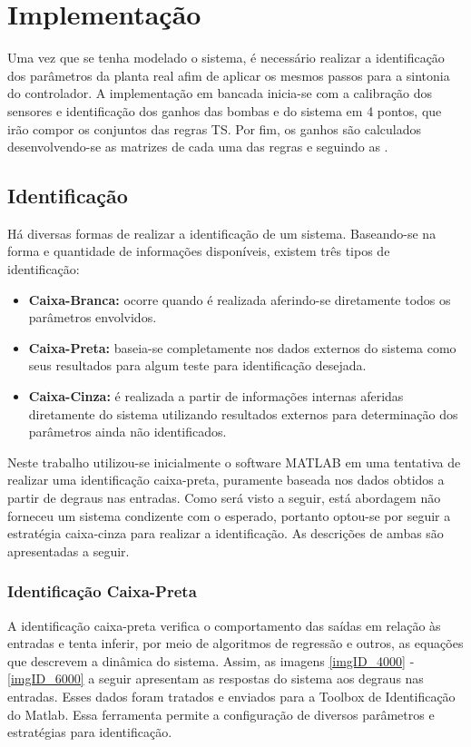 %

\chapter{Implementação} \label{capImp}
Uma vez que se tenha modelado o sistema, é necessário realizar a identificação dos parâmetros da planta real afim de aplicar os mesmos passos para a sintonia do controlador. A implementação em bancada inicia-se com a calibração dos sensores e identificação dos ganhos das bombas e do sistema em 4 pontos, que irão compor os conjuntos das regras TS. Por fim, os ganhos são calculados desenvolvendo-se as matrizes de cada uma das regras e seguindo as .

\section{Identificação}
Há diversas formas de realizar a identificação de um sistema. Baseando-se na forma e quantidade de informações disponíveis, existem três tipos de identificação:
\begin{itemize}
	\item \textbf{Caixa-Branca:} ocorre quando é realizada aferindo-se diretamente todos os parâmetros envolvidos.
	\item \textbf{Caixa-Preta:} baseia-se completamente nos dados externos do sistema como seus resultados para algum teste para identificação desejada.
	\item \textbf{Caixa-Cinza:} é realizada a partir de informações internas aferidas diretamente do sistema utilizando resultados externos para determinação dos parâmetros ainda não identificados.
\end{itemize}

Neste trabalho utilizou-se inicialmente o software MATLAB em uma tentativa de realizar uma identificação caixa-preta, puramente baseada nos dados obtidos a partir de degraus nas entradas. Como será visto a seguir, está abordagem não forneceu um sistema condizente com o esperado, portanto optou-se por seguir a estratégia caixa-cinza para realizar a identificação. As descrições de ambas são apresentadas a seguir.

\subsection{Identificação Caixa-Preta}
A identificação caixa-preta verifica o comportamento das saídas em relação às entradas e tenta inferir, por meio de algoritmos de regressão e outros, as equações que descrevem a dinâmica do sistema. Assim, as imagens \ref{imgID_4000} - \ref{imgID_6000} a seguir apresentam as respostas do sistema aos degraus nas entradas. Esses dados foram tratados e enviados para a Toolbox de Identificação do Matlab. 
Essa ferramenta permite a configuração de diversos parâmetros e estratégias para identificação.

